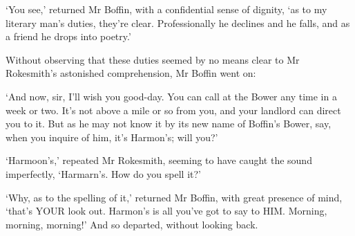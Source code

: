 ‘You see,’ returned Mr Boffin, with a confidential sense of dignity, ‘as
to my literary man’s duties, they’re clear. Professionally he declines
and he falls, and as a friend he drops into poetry.’

Without observing that these duties seemed by no means clear to Mr
Rokesmith’s astonished comprehension, Mr Boffin went on:

‘And now, sir, I’ll wish you good-day. You can call at the Bower any
time in a week or two. It’s not above a mile or so from you, and your
landlord can direct you to it. But as he may not know it by its new
name of Boffin’s Bower, say, when you inquire of him, it’s Harmon’s;
will you?’

‘Harmoon’s,’ repeated Mr Rokesmith, seeming to have caught the sound
imperfectly, ‘Harmarn’s. How do you spell it?’

‘Why, as to the spelling of it,’ returned Mr Boffin, with great presence
of mind, ‘that’s YOUR look out. Harmon’s is all you’ve got to say to
HIM. Morning, morning, morning!’ And so departed, without looking back.



